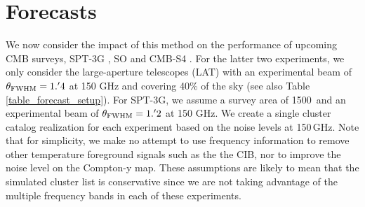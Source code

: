 

\section{Forecasts}
\label{forecasts}

We now consider the impact of this method on the performance of upcoming CMB surveys, SPT-3G \citep{bender18}, SO \citep{so18} and CMB-S4 \citep{cmbs4-sb1}. 
For the latter two experiments, we only consider the large-aperture telescopes (LAT) with an experimental beam of $\theta_{\rm FWHM} = 1.^{\prime}4$ at 150 GHz and covering 40\% of the sky (see also Table \ref{table_forecast_setup}). 
For SPT-3G, we assume a survey area of 1500\,\sqdeg{} and an experimental beam of $\theta_{\rm FWHM} = 1.^{\prime}2$ at 150 GHz. 
We create a single cluster catalog realization for each experiment based on the noise levels at 150\,GHz. 
Note that for simplicity, we make no attempt to use frequency information to remove other temperature foreground signals such as the the CIB, nor to improve the noise level on the Compton-y map. 
These assumptions are likely to mean that the simulated cluster list is conservative since we are not taking advantage of the multiple frequency bands in each of these experiments. 

